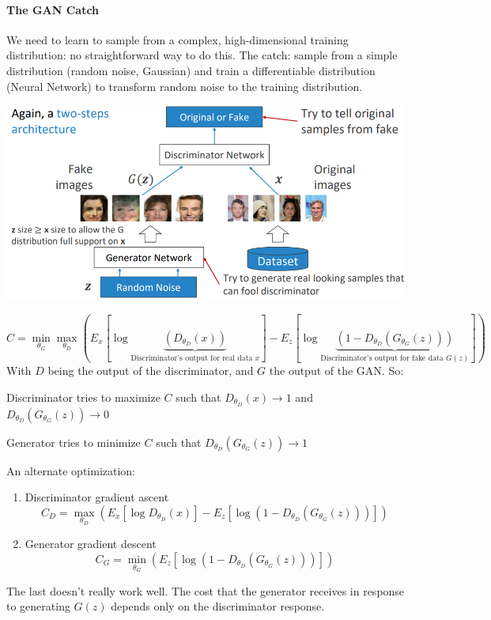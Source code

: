 \documentclass[10pt]{report}
\begin{document}
\paragraph{The GAN Catch} We need to learn to sample from a complex, high-dimensional training distribution: no straightforward way to do this. The catch: sample from a simple distribution (random noise, Gaussian) and train a differentiable distribution (Neural Network) to transform random noise to the training distribution.
\begin{center}
	\includegraphics[scale=0.5]{148.png}
\end{center}
$$C = \min_{\theta_G}\max_{\theta_D}\left(E_x[\log\underset{\text{Discriminator's output for real data }x}{\underbrace{ (D_{\theta_D}(x))}}]-E_z[\log\underset{\text{Discriminator's output for fake data }G(z)}{\underbrace{(1-D_{\theta_D}(G_{\theta_G}(z)))}}]\right)$$
With $D$ being the output of the discriminator, and $G$ the output of the GAN. So:
\begin{list}{}{}
	\item Discriminator tries to maximize $C$ such that $D_{\theta_D}(x)\rightarrow 1$ and $D_{\theta_D}(G_{\theta_G}(z))\rightarrow 0$
	\item Generator tries to minimize $C$ such that $D_{\theta_D}(G_{\theta_G}(z))\rightarrow 1$
\end{list}
An alternate optimization:\begin{enumerate}
\item Discriminator gradient ascent 
$$C_D = \max_{\theta_D}\left(E_x[\log D_{\theta_D}(x)]-E_z[\log(1-D_{\theta_D}(G_{\theta_G}(z)))]\right)$$
\item Generator gradient descent
$$C_G =  \min_{\theta_G}(E_z[\log(1-D_{\theta_D}(G_{\theta_G}(z)))])$$
\end{enumerate}
The last doesn't really work well. The cost that the generator receives in response to generating $G(z)$ depends only on the discriminator response.
\end{document}
